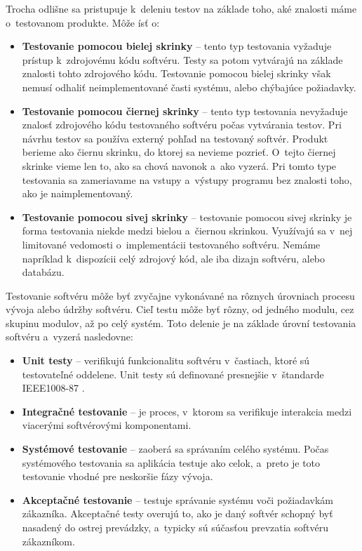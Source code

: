 \noindent Trocha odlišne sa pristupuje k~deleniu testov na základe toho, 
aké znalosti máme o~testovanom produkte. Môže ísť o:
\begin{itemize}
\item \textbf{Testovanie pomocou bielej skrinky} --
tento typ testovania vyžaduje prístup k~zdrojovému kódu softvéru. 
Testy sa potom vytvárajú na základe znalosti tohto zdrojového kódu.
Testovanie pomocou bielej skrinky však nemusí odhaliť neimplementované 
časti systému, alebo chýbajúce požiadavky.

\item \textbf{Testovanie pomocou čiernej skrinky} --
tento typ testovania nevyžaduje znalosť zdrojového kódu testovaného softvéru 
počas vytvárania testov. Pri návrhu testov sa používa externý pohľad na 
testovaný softvér.  Produkt berieme ako čiernu skrinku, do ktorej sa 
nevieme pozrieť. O~tejto čiernej skrinke vieme len to, ako sa chová 
navonok a~ako vyzerá. Pri tomto type testovania sa zameriavame na vstupy 
a~výstupy programu bez znalosti toho, ako je naimplementovaný.

\item \textbf{Testovanie pomocou sivej skrinky} --
testovanie pomocou sivej skrinky je forma testovania niekde medzi bielou
a~čiernou skrinkou. Využívajú sa v~nej limitované vedomosti 
o~implementácii testovaného softvéru. Nemáme napríklad k~dispozícii celý
zdrojový kód, ale iba dizajn softvéru, alebo databázu.
\end{itemize}

\noindent Testovanie softvéru môže byť zvyčajne vykonávané na rôznych úrovniach 
procesu vývoja alebo údržby softvéru. Cieľ testu môže byť rôzny, od jedného
modulu, cez skupinu modulov, až po celý systém.
Toto delenie je na základe úrovní testovania softvéru a~vyzerá nasledovne:
\begin{itemize}
\item \textbf{Unit testy} --
verifikujú funkcionalitu softvéru v~častiach, ktoré sú 
testovateľné oddelene.
Unit testy sú definované presnejšie v~štandarde IEEE1008-87 \cite{Ieee_unit}.

\item \textbf{Integračné testovanie} --
je proces, v~ktorom sa verifikuje interakcia medzi viacerými 
softvérovými komponentami.

\item \textbf{Systémové testovanie} --
zaoberá sa správaním celého systému. Počas systémového testovania sa 
aplikácia testuje ako celok, a~preto je toto testovanie vhodné pre 
neskoršie fázy vývoja.

\item \textbf{Akceptačné testovanie} --
testuje správanie systému voči požiadavkám zákazníka. Akceptačné testy 
overujú to, ako je daný softvér schopný byť nasadený do ostrej prevádzky, 
a~typicky sú súčasťou prevzatia softvéru zákazníkom.
\end{itemize}

